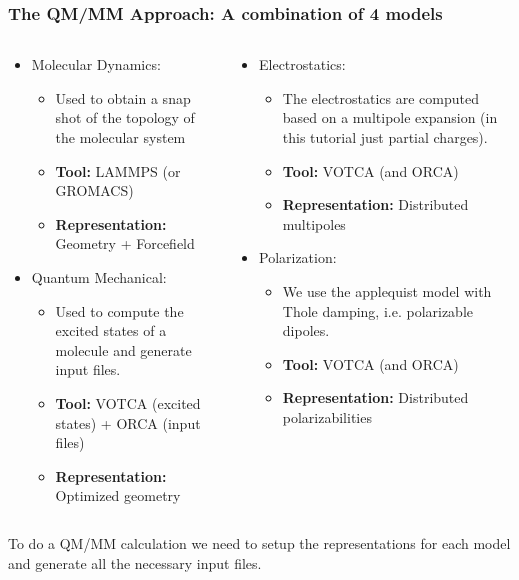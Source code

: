 \documentclass[t,aspectratio=169, 8pt]{beamer}
\begin{document}
\begin{frame}
  \frametitle{The QM/MM Approach: A combination of 4 models}
  \begin{columns}[t]
    \begin{column}{0.44\textwidth}
        \begin{itemize}
          \item Molecular Dynamics:
          \begin{itemize}
            \item Used to obtain a snap shot of the topology of the molecular system
            \item \textbf{Tool:} LAMMPS (or GROMACS)
            \item \textbf{Representation:} Geometry + Forcefield
          \end{itemize}
          \item Quantum Mechanical:
          \begin{itemize}
            \item Used to compute the excited states of a molecule and generate input files.
            \item \textbf{Tool:} VOTCA (excited states) + ORCA (input files) 
            \item \textbf{Representation:} Optimized geometry
          \end{itemize}
        \end{itemize}
    \end{column}
    \begin{column}{0.44\textwidth}
      \begin{itemize}
        \item Electrostatics:
        \begin{itemize}
          \item The electrostatics are computed based on a multipole expansion (in this tutorial just partial charges).
          \item \textbf{Tool:} VOTCA (and ORCA)
          \item \textbf{Representation:} Distributed multipoles
        \end{itemize}
        \item Polarization:
        \begin{itemize}
          \item We use the applequist model with Thole damping, i.e. polarizable dipoles.
          \item \textbf{Tool:} VOTCA (and ORCA)
          \item \textbf{Representation:} Distributed polarizabilities
        \end{itemize}
      \end{itemize}
  \end{column}
\end{columns}
\vspace{0.5cm}
To do a QM/MM calculation we need to setup the representations for each model and generate all the necessary input files.
\end{frame}
\end{document}
